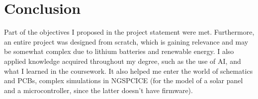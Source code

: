 \section{Conclusion} 

Part of the objectives I proposed in the project statement were met. Furthermore, an entire project was designed from scratch, which is gaining relevance and may be somewhat complex due to lithium batteries and renewable energy. I also applied knowledge acquired throughout my degree, such as the use of AI, and what I learned in the coursework. It also helped me enter the world of schematics and PCBs, complex simulations in NGSPCICE (for the model of a solar panel and a microcontroller, since the latter doesn't have firmware). 